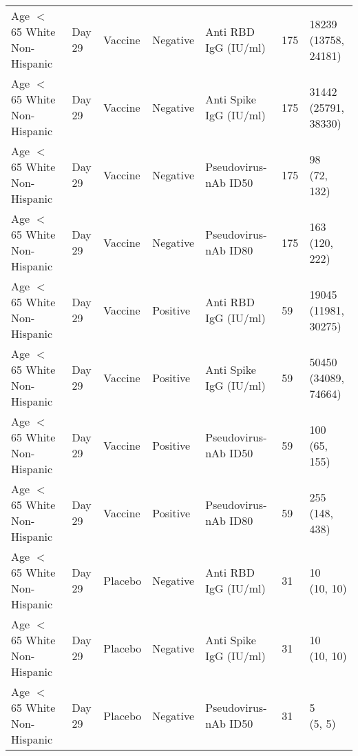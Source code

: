 \documentclass[]{book}
\theoremstyle{definition}
\theoremstyle{definition}
\theoremstyle{definition}
\newcommand{\1}{\mathbbm{1}}
\begin{document}
\begin{landscape}
\begin{ThreePartTable}
\begin{longtable}[t]{>{\raggedright\arraybackslash}p{7cm}llllll}
\hspace{1em}Age $<$ 65 White Non-Hispanic & Day 29 & Vaccine & Negative & Anti RBD IgG (IU/ml) & 175 & \makecell[l]{18239\\(13758, 24181)}\\
\hspace{1em}Age $<$ 65 White Non-Hispanic & Day 29 & Vaccine & Negative & Anti Spike IgG (IU/ml) & 175 & \makecell[l]{31442\\(25791, 38330)}\\
\hspace{1em}Age $<$ 65 White Non-Hispanic & Day 29 & Vaccine & Negative & Pseudovirus-nAb ID50 & 175 & \makecell[l]{98\\(72, 132)}\\
\hspace{1em}Age $<$ 65 White Non-Hispanic & Day 29 & Vaccine & Negative & Pseudovirus-nAb ID80 & 175 & \makecell[l]{163\\(120, 222)}\\
\hspace{1em}Age $<$ 65 White Non-Hispanic & Day 29 & Vaccine & Positive & Anti RBD IgG (IU/ml) & 59 & \makecell[l]{19045\\(11981, 30275)}\\
\hspace{1em}Age $<$ 65 White Non-Hispanic & Day 29 & Vaccine & Positive & Anti Spike IgG (IU/ml) & 59 & \makecell[l]{50450\\(34089, 74664)}\\
\hspace{1em}Age $<$ 65 White Non-Hispanic & Day 29 & Vaccine & Positive & Pseudovirus-nAb ID50 & 59 & \makecell[l]{100\\(65, 155)}\\
\hspace{1em}Age $<$ 65 White Non-Hispanic & Day 29 & Vaccine & Positive & Pseudovirus-nAb ID80 & 59 & \makecell[l]{255\\(148, 438)}\\
\hspace{1em}Age $<$ 65 White Non-Hispanic & Day 29 & Placebo & Negative & Anti RBD IgG (IU/ml) & 31 & \makecell[l]{10\\(10, 10)}\\
\hspace{1em}Age $<$ 65 White Non-Hispanic & Day 29 & Placebo & Negative & Anti Spike IgG (IU/ml) & 31 & \makecell[l]{10\\(10, 10)}\\
\hspace{1em}Age $<$ 65 White Non-Hispanic & Day 29 & Placebo & Negative & Pseudovirus-nAb ID50 & 31 & \makecell[l]{5\\(5, 5)}\\

\end{longtable}
\end{ThreePartTable}
\end{landscape}
\end{document}
